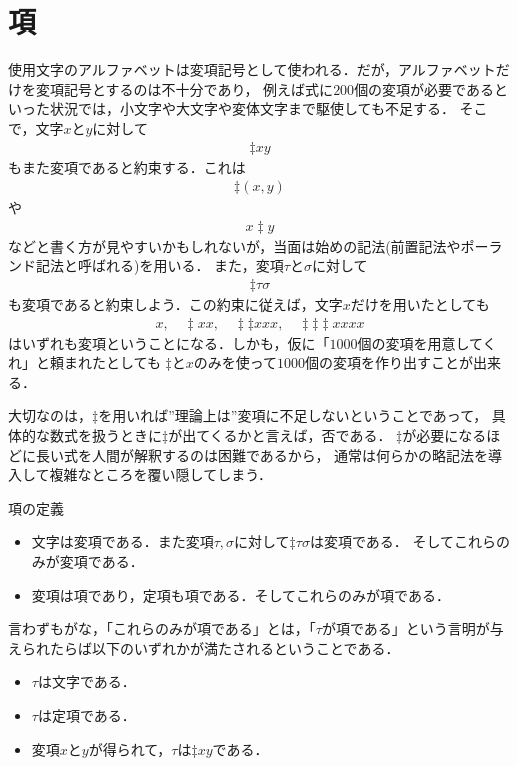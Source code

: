 \documentclass[a4j,10.5pt,oneside,openany]{jsbook}
\begin{document}
\section{項}
	
	使用文字のアルファベットは変項記号として使われる．だが，アルファベットだけを変項記号とするのは不十分であり，
	例えば式に$200$個の変項が必要であるといった状況では，小文字や大文字や変体文字まで駆使しても不足する．
	そこで，文字$x$と$y$に対して
	\begin{align}
		\ddagger xy
	\end{align}
	もまた変項であると約束する．これは
	\begin{align}
		\ddagger(x,y)
	\end{align}
	や
	\begin{align}
		x \ddagger y
	\end{align}
	などと書く方が見やすいかもしれないが，当面は始めの記法(前置記法やポーランド記法と呼ばれる)を用いる．
	また，変項$\tau$と$\sigma$に対して
	\begin{align}
		\ddagger \tau \sigma
	\end{align}
	も変項であると約束しよう．この約束に従えば，文字$x$だけを用いたとしても
	\begin{align}
		x,\quad \ddagger xx, \quad \ddagger \ddagger xxx, \quad \ddagger \ddagger \ddagger xxxx
	\end{align}
	はいずれも変項ということになる．しかも，仮に「$1000$個の変項を用意してくれ」と頼まれたとしても
	$\ddagger$と$x$のみを使って$1000$個の変項を作り出すことが出来る．
	
	大切なのは，$\ddagger$を用いれば''理論上は''変項に不足しないということであって，
	具体的な数式を扱うときに$\ddagger$が出てくるかと言えば，否である．
	$\ddagger$が必要になるほどに長い式を人間が解釈するのは困難であるから，
	通常は何らかの略記法を導入して複雑なところを覆い隠してしまう．

	\begin{itembox}[l]{項の定義}
		\begin{itemize}
			\item 文字は変項である．また変項$\tau,\sigma$に対して$\ddagger \tau \sigma$は変項である．
				そしてこれらのみが変項である．
				
			\item 変項は項であり，定項も項である．そしてこれらのみが項である．
		\end{itemize}
	\end{itembox}
	
	言わずもがな，「これらのみが項である」とは，「$\tau$が項である」という言明が与えられたらば以下のいずれかが満たされるということである．
	\begin{itemize}
		\item $\tau$は文字である．
		\item $\tau$は定項である．
		\item 変項$x$と$y$が得られて，$\tau$は$\ddagger xy$である．
	\end{itemize}
	
\end{document}
